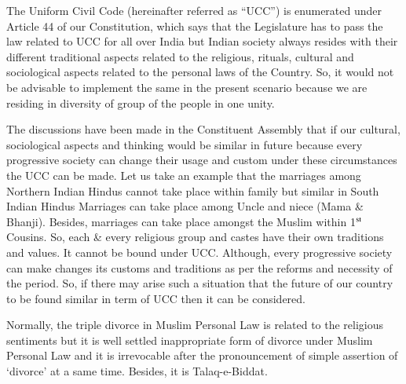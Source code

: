 \setcounter{figure}{0}
\setcounter{table}{0}
\setcounter{footnote}{0}

\label{2021-art2}



\begin{multicols}{2}


\noi
The Uniform Civil Code (hereinafter referred as “UCC”) is enumerated under Article 44 of
our Constitution, which says that the Legislature has to pass the law related to UCC for all
over India but Indian society always resides with their different traditional aspects related to
the religious, rituals, cultural and sociological aspects related to the personal laws of the
Country. So, it would not be advisable to implement the same in the present scenario because
we are residing in diversity of group of the people in one unity.

\vspace{-.1cm}

\noi
The discussions have been made in the Constituent Assembly that if our cultural, sociological
aspects and thinking would be similar in future because every progressive society can change
their usage and custom under these circumstances the UCC can be made. Let us take an
example that the marriages among Northern Indian Hindus cannot take place within family
but similar in South Indian Hindus Marriages can take place among Uncle and niece (Mama
\& Bhanji). Besides, marriages can take place amongst the Muslim within 1$^{\rm st}$ Cousins. So,
each \& every religious group and castes have their own traditions and values. It cannot be
bound under UCC. Although, every progressive society can make changes its customs and
traditions as per the reforms and necessity of the period. So, if there may arise such a
situation that the future of our country to be found similar in term of UCC then it can be
considered.

\vspace{-.1cm}

\noi
Normally, the triple divorce in Muslim Personal Law is related to the religious sentiments but
it is well settled inappropriate form of divorce under Muslim Personal Law and it is
irrevocable after the pronouncement of simple assertion of ‘divorce’ at a same time. Besides,
it is Talaq-e-Biddat.


\end{multicols}
